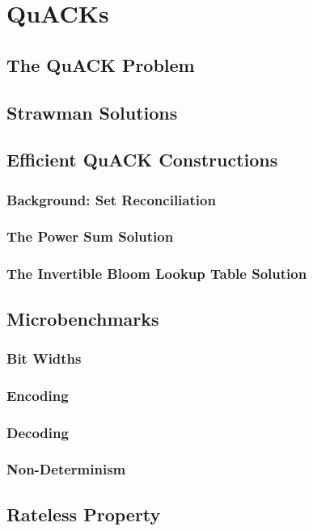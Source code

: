 \chapter{QuACKs}
\cite{yuan2022sidecar}
\section{The QuACK Problem}
\section{Strawman Solutions}

\section{Efficient QuACK Constructions}
\subsection{Background: Set Reconciliation}
\subsection{The Power Sum Solution}
\subsection{The Invertible Bloom Lookup Table Solution}
\section{Microbenchmarks}
\subsection{Bit Widths}
\subsection{Encoding}
\subsection{Decoding}
\subsection{Non-Determinism}
\section{Rateless Property}